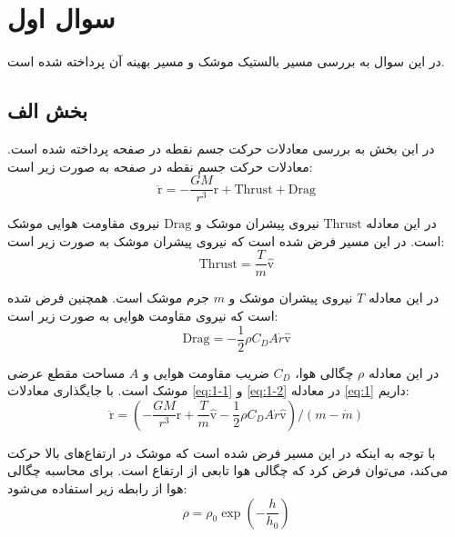 \section{سوال اول}
در این سوال به بررسی مسیر بالستیک موشک و مسیر بهینه آن پرداخته شده است.
\subsection{بخش الف}
در این بخش به بررسی معادلات حرکت جسم نقطه در صفحه پرداخته شده است. معادلات حرکت جسم نقطه در صفحه به صورت زیر است:
\begin{equation}
    \label{eq:1}
    \ddot{\boldsymbol{\mathrm{r}}} = -\dfrac{GM}{r^3}\boldsymbol{\mathrm{r}} + \mathrm{Thrust} + \mathrm{Drag}
\end{equation}

در این معادله
$\mathrm{Thrust}$
نیروی پیشران موشک و
$\mathrm{Drag}$
نیروی مقاومت هوایی موشک است. در این مسیر فرض شده است که نیروی پیشران موشک به صورت زیر است:
\begin{equation}
    \label{eq:1-1}
    \mathrm{Thrust} = \dfrac{T}{m}\hat{\boldsymbol{\mathrm{v}}}
\end{equation}

در این معادله $T$ نیروی پیشران موشک و $m$ جرم موشک است. همچنین فرض شده است که نیروی مقاومت هوایی به صورت زیر است:
\begin{equation}
    \label{eq:1-2}
    \mathrm{Drag} = -\dfrac{1}{2}\rho C_D A \dot{r}\hat{\boldsymbol{\mathrm{v}}}
\end{equation}

در این معادله $\rho$ چگالی هوا، $C_D$ ضریب مقاومت هوایی و $A$ مساحت مقطع عرضی موشک است. با جایگذاری معادلات \eqref{eq:1-1} و \eqref{eq:1-2} در معادله \eqref{eq:1} داریم:
\begin{equation}
    \label{eq:1-4}
    \ddot{\boldsymbol{\mathrm{r}}} = \left(-\dfrac{GM}{r^3}\boldsymbol{\mathrm{r}} + \dfrac{T}{m}\hat{\boldsymbol{\mathrm{v}}} - \dfrac{1}{2}\rho C_D A \dot{r}\hat{\boldsymbol{\mathrm{v}}}\right)/(m-\dot{m})
\end{equation}

با توجه به اینکه در این مسیر فرض شده است که موشک در ارتفاع‌های بالا حرکت می‌کند، می‌توان فرض کرد که چگالی هوا تابعی از ارتفاع است. برای محاسبه چگالی هوا از رابطه زیر استفاده می‌شود:
\begin{equation}
    \label{eq:5}
    \rho = \rho_0 \exp\left(-\dfrac{h}{h_0}\right)
\end{equation}


